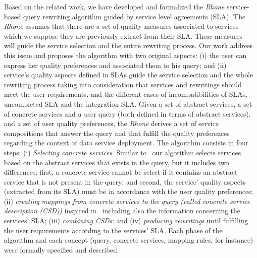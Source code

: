 \documentclass[11pt,a4paper,oneside]{report}
\begin{document}
Based on the related work, we have developed and formalized the \textit{Rhone} service-based query rewriting algorithm guided by service level agreements (SLA). The \textit{Rhone} assumes that there are a set of quality measures associated to services which we suppose they are previously extract from their SLA. These measures will guide the service selection and the entire rewriting process.  Our work address this issue and proposes the algorithm with two original aspects: (i) the user can express her quality preferences and associated them to his query; and (ii) service's quality aspects defined in SLAs guide the service selection and the whole rewriting process taking into consideration that services and rewritings should meet the user requirements, and the different cases of incompatibilities of SLAs, uncompleted SLA and the integration SLA. 
Given a set of abstract services, a set of concrete services and a user query (both defined in terms of abstract services), and a set of user quality preferences, the \textit{Rhone} derives a set of service compositions that answer the query and that fulfill the quality preferences regarding the context of data service deployment. The algorithm consists in four steps: (i) \textit{Selecting concrete services}. Similar to~\cite{Levy:1996,Pottinger:2001} our algorithm selects services based on the abstract services that exists in the query, but it includes two differences: first, a concrete service cannot be select if it contains an abstract service that is not present in the query; and second, the service' quality aspects (extracted from its SLA) must be in accordance with the user quality preferences; (ii) \textit{creating mappings from concrete services to the query (called concrete service description (CSD))} inspired in~\cite{Pottinger:2001} including also the information concerning the services' SLA; (iii) \textit{combining CSDs}; and (iv) \textit{producing rewritings} until fulfilling the user requirements according to the services' SLA. Each phase of the algorithm and each concept (query, concrete services, mapping rules, for instance) were formally specified and described.

\end{document}
